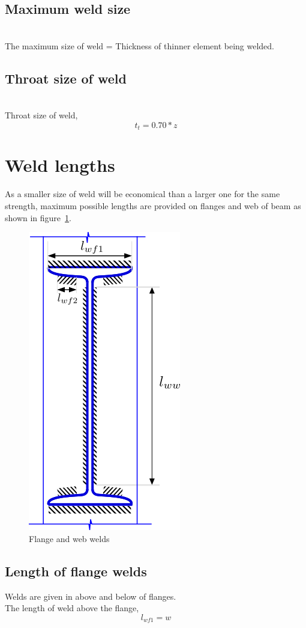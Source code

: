 \documentclass[11.5pt,a4paper,oneside]{report}
\begin{document}
\begin{Form}
\subsection{Maximum weld size}
\quad \quad [Reference: Cl. 10.5.3, IS 800:2007] \\

The maximum size of weld = Thickness of thinner element being welded. \\


\subsection{Throat size of weld}
\quad \quad [Reference: Cl. 10.5.3.2, IS 800:2007] \\
Throat size of weld, 
\begin{equation}
	t_t = 0.70 * z
\end{equation}


\section{Weld lengths}
As a smaller size of weld will be economical than a larger one for the same strength, maximum possible lengths are provided on flanges and web of beam as shown in figure~\ref{fig:weldlength}.
\begin{figure}[h]
	\centering
	\includegraphics[width=0.2\linewidth]{weld_length}
	\caption{Flange and web welds}
	\label{fig:weldlength}
\end{figure}

\subsection{Length of flange welds}

Welds are given in above and below of flanges. \\
The length of weld above the flange, 
\begin{equation}
	l_{wf1} = w
\end{equation}


\end{Form}
\end{document}

